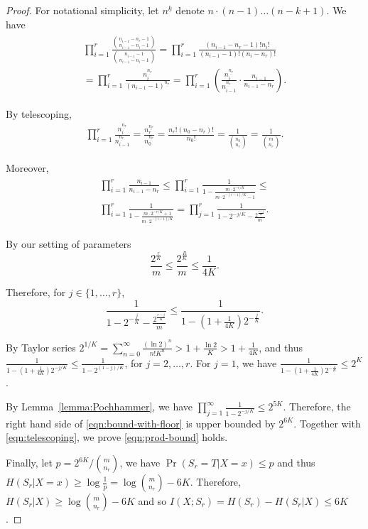 \begin{proof}
  For notational simplicity, let $n^{\underline{k}}$ denote $n\cdot (n-1)\ldots (n-k+1)$. We have 
  \begin{align}
  \begin{split}
    \prod_{i=1}^{r}{\frac{{n_{i-1}-n_r-1 \choose n_{i-1}-n_i-1}}{{n_{i-1}-1 \choose n_{i-1}-n_i-1}}}
    =\prod_{i=1}^{r}\frac{(n_{i-1}-n_r-1)!n_i!}{(n_{i-1}-1)!(n_i-n_r)!} \\
    =\prod_{i=1}^{r}\frac{n_i^{\underline{n_r}}}{(n_{i-1}-1)^{\underline{n_r}}}
    =\prod_{i=1}^{r} \left( \frac{n_i^{\underline{n_r}}}{n_{i-1}^{\underline{n_r}}}\cdot \frac{n_{i-1}}{n_{i-1}-n_r} \right).
    \end{split}
  \end{align}

  By telescoping,
  \begin{align}
    \prod_{i=1}^{r} \frac{n_i^{\underline{n_r}}}{n_{i-1}^{\underline{n_r}}}
    =\frac{n_r^{\underline{n_r}}}{n_0^{\underline{n_r}}}
    =\frac{n_r!(n_0-n_r)!}{n_0!}=\frac{1}{{n_0 \choose n_r}}
    =\frac{1}{{m \choose n_r}}.
    \label{eqn:telescoping}
  \end{align}
  
  Moreover, 
  \begin{align}
  \begin{split}
    \prod_{i=1}^{r} \frac{n_{i-1}}{n_{i-1}-n_r}
    \le\prod_{i=1}^{r} \frac{1}{1-\frac{m\cdot 2^{-r/K}}{m\cdot 2^{-(i-1)/K}-1}}
    \le \\
    \prod_{i=1}^{r} \frac{1}{1-\frac{m\cdot 2^{-r/K}+1}{m\cdot 2^{-(i-1)/K}}}
    =\prod_{j=1}^{r} \frac{1}{1-2^{-j/K}-\frac{2^{\frac{r-j}{K}}}m}.
    \label{eqn:bound-with-floor}
    \end{split}
  \end{align}
  
  By our setting of parameters 
  $$\frac{2^{\frac rK}}m \le \frac{2^{\frac RK}}m \le \frac{1}{4K} .$$
  
  Therefore, for $j\in \{1,\ldots, r\}$,
  $$\frac{1}{1-2^{-\frac jK}-\frac{2^{\frac{r-j}{K}}}m}\le \frac{1}{1-(1+\frac{1}{4K})2^{-\frac jK}}.$$ 
  
  By Taylor series $2^{1/K} = \sum_{n=0}^{\infty}{\frac{(\ln 2 )^n}{n!K^n}} >1+\frac{\ln 2}{K}>1+\frac{1}{4K}$, and thus $\frac{1}{1-(1+\frac{1}{4K})2^{-j/K}}\le \frac{1}{1-2^{(1-j)/K}}$, for $j=2,\ldots, r$. For $j=1$, we have $\frac{1}{1-(1+\frac{1}{4K})2^{-\frac 1K}} \le 2^K$.
  
  By Lemma~\ref{lemma:Pochhammer}, we have $\prod_{j=1}^{\infty} \frac{1}{1-2^{-j/K}}\le 2^{5K}$. Therefore, the right hand side of \eqref{eqn:bound-with-floor} is upper bounded by $2^{6K}$. Together with \eqref{eqn:telescoping}, we prove \eqref{eqn:prod-bound} holds.  
  
  Finally, let $p={2^{6K}}/{{m\choose n_r}}$, we have $\Pr(S_r=T|X=x)\le p$ and thus $H(S_r|X=x)\ge \log\frac{1}{p}=\log{{m\choose n_r}}-6K$. Therefore, $H(S_r|X)\ge \log{{m\choose n_r}}-6K$ and so $I(X;S_r)=H(S_r)-H(S_r|X)\le 6K$.  
\end{proof}

